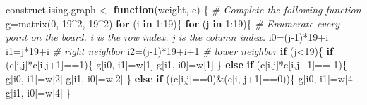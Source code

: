 \documentclass[
]{article}
\newenvironment{Shaded}{\begin{snugshade}}{\end{snugshade}}
\newcommand{\CommentTok}[1]{\textcolor[rgb]{0.56,0.35,0.01}{\textit{#1}}}
\newcommand{\ControlFlowTok}[1]{\textcolor[rgb]{0.13,0.29,0.53}{\textbf{#1}}}
\newcommand{\DecValTok}[1]{\textcolor[rgb]{0.00,0.00,0.81}{#1}}
\newcommand{\FunctionTok}[1]{\textcolor[rgb]{0.00,0.00,0.00}{#1}}
\newcommand{\NormalTok}[1]{#1}
\newcommand{\OtherTok}[1]{\textcolor[rgb]{0.56,0.35,0.01}{#1}}
\newcommand{\SpecialCharTok}[1]{\textcolor[rgb]{0.00,0.00,0.00}{#1}}
\begin{document}
\begin{Shaded}
\begin{Highlighting}[]
\NormalTok{construct.ising.graph }\OtherTok{\textless{}{-}} \ControlFlowTok{function}\NormalTok{(weight, c) \{ }\CommentTok{\# Complete the following function}
\NormalTok{    g}\OtherTok{=}\FunctionTok{matrix}\NormalTok{(}\DecValTok{0}\NormalTok{, }\DecValTok{19}\SpecialCharTok{\^{}}\DecValTok{2}\NormalTok{, }\DecValTok{19}\SpecialCharTok{\^{}}\DecValTok{2}\NormalTok{)}
    \ControlFlowTok{for}\NormalTok{ (i }\ControlFlowTok{in} \DecValTok{1}\SpecialCharTok{:}\DecValTok{19}\NormalTok{)\{}
        \ControlFlowTok{for}\NormalTok{ (j }\ControlFlowTok{in} \DecValTok{1}\SpecialCharTok{:}\DecValTok{19}\NormalTok{)\{ }\CommentTok{\# Enumerate every point on the board. i is the row index. j is the column index.}
\NormalTok{            i0}\OtherTok{=}\NormalTok{(j}\DecValTok{{-}1}\NormalTok{)}\SpecialCharTok{*}\DecValTok{19}\SpecialCharTok{+}\NormalTok{i}
\NormalTok{            i1}\OtherTok{=}\NormalTok{j}\SpecialCharTok{*}\DecValTok{19}\SpecialCharTok{+}\NormalTok{i }\CommentTok{\# right neighbor}
\NormalTok{            i2}\OtherTok{=}\NormalTok{(j}\DecValTok{{-}1}\NormalTok{)}\SpecialCharTok{*}\DecValTok{19}\SpecialCharTok{+}\NormalTok{i}\SpecialCharTok{+}\DecValTok{1} \CommentTok{\# lower neighbor}
            \ControlFlowTok{if}\NormalTok{ (j}\SpecialCharTok{\textless{}}\DecValTok{19}\NormalTok{)\{}
                \ControlFlowTok{if}\NormalTok{ (c[i,j]}\SpecialCharTok{*}\NormalTok{c[i,j}\SpecialCharTok{+}\DecValTok{1}\NormalTok{]}\SpecialCharTok{==}\DecValTok{1}\NormalTok{)\{}
\NormalTok{                    g[i0, i1]}\OtherTok{=}\NormalTok{w[}\DecValTok{1}\NormalTok{]}
\NormalTok{                    g[i1, i0]}\OtherTok{=}\NormalTok{w[}\DecValTok{1}\NormalTok{]}
\NormalTok{                \}}
                \ControlFlowTok{else} \ControlFlowTok{if}\NormalTok{ (c[i,j]}\SpecialCharTok{*}\NormalTok{c[i,j}\SpecialCharTok{+}\DecValTok{1}\NormalTok{]}\SpecialCharTok{=={-}}\DecValTok{1}\NormalTok{)\{}
\NormalTok{                    g[i0, i1]}\OtherTok{=}\NormalTok{w[}\DecValTok{2}\NormalTok{]}
\NormalTok{                    g[i1, i0]}\OtherTok{=}\NormalTok{w[}\DecValTok{2}\NormalTok{]}
\NormalTok{                \}   }
                \ControlFlowTok{else} \ControlFlowTok{if}\NormalTok{ ((c[i,j]}\SpecialCharTok{==}\DecValTok{0}\NormalTok{)}\SpecialCharTok{\&}\NormalTok{(c[i, j}\SpecialCharTok{+}\DecValTok{1}\NormalTok{]}\SpecialCharTok{==}\DecValTok{0}\NormalTok{))\{}
\NormalTok{                    g[i0, i1]}\OtherTok{=}\NormalTok{w[}\DecValTok{4}\NormalTok{]}
\NormalTok{                    g[i1, i0]}\OtherTok{=}\NormalTok{w[}\DecValTok{4}\NormalTok{]}
\NormalTok{                \}}

\end{Highlighting}
\end{Shaded}
\end{document}
